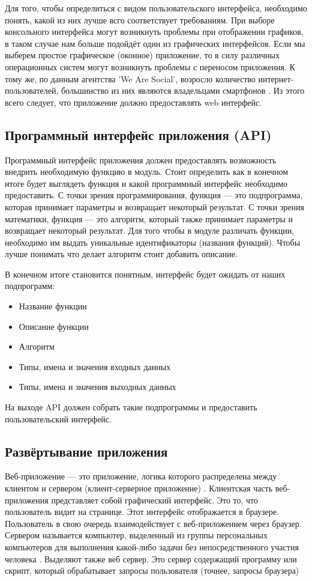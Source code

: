 \documentclass[14pt,a4paper]{scrartcl}
\begin{document}
    Для того, чтобы определиться с видом пользовательского интерфейса, необходимо понять, какой из них лучше всго соответствует требованиям. При выборе консольного интерфейса могут возникнуть проблемы при отображении графиков, в таком случае нам больше подойдёт один из графических интерфейсов. Если мы выберем простое графическое (оконное) приложение, то в силу различных операционных систем могут возникнуть проблемы с переносом приложения. К тому же, по данным агентства 'We Are Social', возросло количество интернет-пользователей, большинство из них являются владельцами смартфонов \cite{Internet-statistic-2018}. Из этого всего следует, что приложение должно предоставлять web интерфейс.

    \subsection[Программный интерфейс приложения]{Программный интерфейс приложения (API)}
    Программный интерфейс приложения должен предоставлять возможность внедрить необходимую функцию в модуль. Стоит определить как в конечном итоге будет выглядеть функция и какой программный интерфейс необходимо предоставить. С точки зрения программирования, функция --- это подпрограмма, которая принимает параметры и возвращает некоторый результат. С точки зрения математики, функция --- это алгоритм, который также принимает параметры и возвращает некоторый результат. Для того чтобы в модуле различать функции, необходимо им выдать уникальные идентификаторы (названия функций). Чтобы лучше понимать что делает алгоритм стоит добавить описание.

    В конечном итоге становится понятным, интерфейс будет ожидать от наших подпрограмм:
    \begin{itemize}
        \item Название функции
        \item Описание функции
        \item Алгоритм
        \item Типы, имена и значения входных данных
        \item Типы, имена и значения выходных данных
    \end{itemize}
    На выходе API должен собрать такие подпрограммы и предоставить пользовательский интерфейс.

    \subsection[Развёртывание приложения]{Развёртывание приложения}
    Веб-приложение — это приложение, логика которого распределена между клиентом и сервером (клиент-серверное приложение) \cite{Web-app-wiki}. Клиентская часть веб-приложения представляет собой графический интерфейс. Это то, что пользователь видит на странице. Этот интерфейс отображается в браузере. Пользователь в свою очередь взаимодействует с веб-приложением через браузер. Сервером называется компьютер, выделенный из группы персональных компьютеров для выполнения какой-либо задачи без непосредственного участия человека \cite{Server}. Выделяют также веб сервер. Это сервер содержащий программу или скрипт, который обрабатывает запросы пользователя (точнее, запросы браузера) \cite{Web-app-struct}
\end{document}
